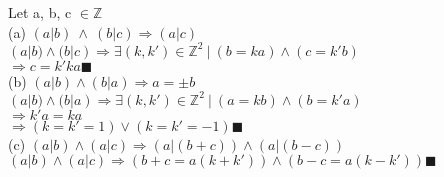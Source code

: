 \documentclass{article}
\begin{document}
\noindent Let a, b, c $\in \mathbb{Z}$\\

\noindent(a) $ (a | b) \  \land \ ( b | c ) \Rightarrow  (a | c) $\\
$(a | b) \land (b|c) \Rightarrow \exists (k, k') \in \mathbb{Z}^2
\ |\  (b = ka) \land (c = k'b)$\\
$\Rightarrow c = k'ka\blacksquare$\\

\noindent(b) $ (a|b) \land (b|a) \Rightarrow a = \pm b$\\
$(a|b) \land (b|a) \Rightarrow \exists (k, k') \in \mathbb{Z}^2
\ |\ (a = kb) \land (b = k'a)$\\
$\Rightarrow k'a = ka$\\
$\Rightarrow (k = k' = 1) \lor (k = k' = -1) \blacksquare$\\

\noindent(c) $(a | b) \land (a|c) \Rightarrow (a|(b+c))
\land (a|(b-c))$\\
$(a | b) \land (a|c) \Rightarrow (b + c = a(k + k'))
\land (b - c = a(k - k'))\blacksquare$
\end{document}
